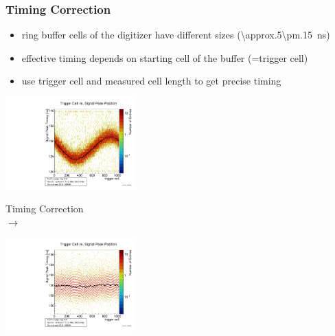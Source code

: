 \documentclass[9pt]{beamer}
\begin{document}
\begin{frame}
	\frametitle{Timing Correction}
	\begin{itemize}
		\item ring buffer cells of the digitizer have different sizes (\SI[separate-uncertainty = true]{\approx.5\pm.15}{ns})
		\item effective timing depends on starting cell of the buffer (=trigger cell)
		\item use trigger cell and measured cell length to get precise timing
	\end{itemize}
	\begin{minipage}{5.0cm}
		\centering
		\includegraphics[angle=270, width=5cm]{TCVSPP}
	\end{minipage}
	\begin{minipage}{1.5cm}
		\centering
		Timing Correction\\
		$\longrightarrow$
	\end{minipage}
	\begin{minipage}{5.0cm}
		\centering
		\includegraphics[angle=270, width=5cm]{TCVSPPCorr}
	\end{minipage}
\end{frame}
\end{document}
